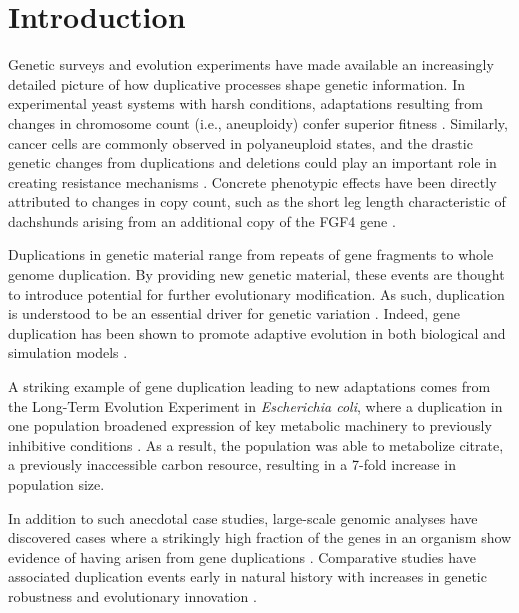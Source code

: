 \section{Introduction} \label{sec:introduction}

Genetic surveys and evolution experiments have made available an increasingly detailed picture of how duplicative processes shape genetic information.
In experimental yeast systems with harsh conditions, adaptations resulting from changes in chromosome count (i.e., aneuploidy) confer superior fitness \citep{Pavelka:2010}.
Similarly, cancer cells are commonly observed in polyaneuploid states, and the drastic genetic changes from duplications and deletions could play an important role in creating resistance mechanisms \citep{polyaneuploidCancer}.
Concrete phenotypic effects have been directly attributed to changes in copy count, such as the short leg length characteristic of dachshunds arising from an additional copy of the FGF4 gene \citep{dachshundGeneCopyNum}.

Duplications in genetic material range from repeats of gene fragments to whole genome duplication.
By providing new genetic material, these events are thought to introduce potential for further evolutionary modification.
As such, duplication is understood to be an essential driver for genetic variation \citep{Zhang:2003fw,Crow:2006role,Magadum:2013wu}.
Indeed, gene duplication has been shown to promote adaptive evolution in both biological and simulation models \citep{Hu:2010ea}.

A striking example of gene duplication leading to new adaptations
comes from the Long-Term Evolution Experiment in \textit{Escherichia coli}, where a duplication in one population broadened expression of key metabolic machinery to previously inhibitive conditions \citep{blount_genomic_2012}.
As a result, the population was able to metabolize citrate, a previously inaccessible carbon resource, resulting in a 7-fold increase in population size.

In addition to such anecdotal case studies, large-scale genomic analyses have discovered cases where a strikingly high fraction of the genes in an organism show evidence of having arisen from gene duplications \citep{teichmann_structural_1998,Teichmann:2004cz}.
Comparative studies have associated duplication events early in natural history with increases in genetic robustness and evolutionary innovation \citep{wagner_gene_2008}.

